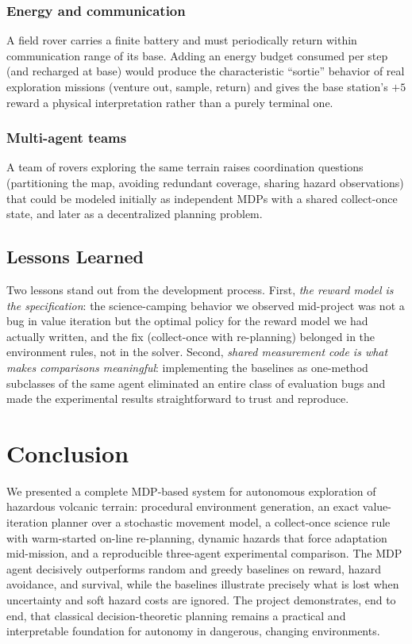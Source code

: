\documentclass[conference]{IEEEtran}
\begin{document}
\subsubsection{Energy and communication} A field rover carries a finite battery and must periodically return within communication range of its base. Adding an energy budget consumed per step (and recharged at base) would produce the characteristic ``sortie'' behavior of real exploration missions (venture out, sample, return) and gives the base station's $+5$ reward a physical interpretation rather than a purely terminal one.

\subsubsection{Multi-agent teams} A team of rovers exploring the same terrain raises coordination questions (partitioning the map, avoiding redundant coverage, sharing hazard observations) that could be modeled initially as independent MDPs with a shared collect-once state, and later as a decentralized planning problem.

\subsection{Lessons Learned}

Two lessons stand out from the development process. First, \emph{the reward model is the specification}: the science-camping behavior we observed mid-project was not a bug in value iteration but the optimal policy for the reward model we had actually written, and the fix (collect-once with re-planning) belonged in the environment rules, not in the solver. Second, \emph{shared measurement code is what makes comparisons meaningful}: implementing the baselines as one-method subclasses of the same agent eliminated an entire class of evaluation bugs and made the experimental results straightforward to trust and reproduce.

\section{Conclusion}\label{sec:conclusion}

We presented a complete MDP-based system for autonomous exploration of hazardous volcanic terrain: procedural environment generation, an exact value-iteration planner over a stochastic movement model, a collect-once science rule with warm-started on-line re-planning, dynamic hazards that force adaptation mid-mission, and a reproducible three-agent experimental comparison. The MDP agent decisively outperforms random and greedy baselines on reward, hazard avoidance, and survival, while the baselines illustrate precisely what is lost when uncertainty and soft hazard costs are ignored. The project demonstrates, end to end, that classical decision-theoretic planning remains a practical and interpretable foundation for autonomy in dangerous, changing environments.
\end{document}
